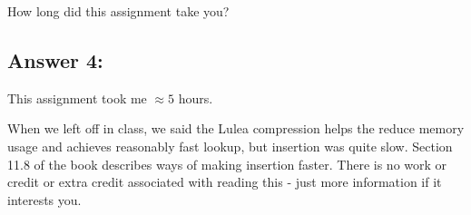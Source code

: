 \documentclass[10pt]{article}
\newenvironment{problem}[2][Problem]{\begin{trivlist}
\item[\hskip \labelsep {\bfseries #1}\hskip \labelsep {\bfseries #2.}]}{\end{trivlist}}
\begin{document}
\begin{problem}{4}
How long did this assignment take you?
\end{problem}
\subsection*{Answer 4:}
This assignment took me $\approx 5$ hours.
\begin{problem}{5: Extra (optional) reading}
When we left off in class, we said the Lulea compression helps the reduce memory usage and achieves reasonably fast lookup, but insertion was quite slow. Section 11.8 of the book describes ways of making insertion faster. There is no work or credit or extra credit associated with reading this - just more information if it interests you.
\end{problem}
\end{document}
